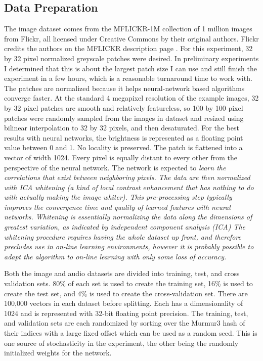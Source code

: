 \documentclass[12pt]{article}
\begin{document}
\begin{doublespacing}
	\subsection{Data Preparation}
	The image dataset comes from the MFLICKR-1M collection of 1 million images from Flickr, all licensed under Creative Commons by their original authors. Flickr credits the authors on the MFLICKR description page \cite{huiskes08}. For this experiment, 32 by 32 pixel normalized greyscale patches were desired. In preliminary experiments I determined that this is about the largest patch size I can use and still finish the experiment in a few hours, which is a reasonable turnaround time to work with. The patches are normalized because it helps neural-network based algorithms converge faster. At the standard 4 megapixel resolution of the example images, 32 by 32 pixel patches are smooth and relatively featureless, so 100 by 100 pixel patches were randomly sampled from the images in dataset and resized using bilinear interpolation to 32 by 32 pixels, and then desaturated. For the best results with neural networks, the brightness is represented as a floating point value between 0 and 1. No locality is preserved. The patch is flattened into a vector of width 1024. Every pixel is equally distant to every other from the perspective of the neural network. The network is expected to \em learn \em the correlations that exist between neighboring pixels. The data are then normalized with ICA whitening (a kind of local contrast enhancement that has nothing to do with actually making the image whiter). This pre-processing step typically improves the convergence time and quality of learned features with neural networks. Whitening is essentially normalizing the data along the dimensions of greatest variation, as indicated by independent component analysis (ICA) The whitening procedure requires having the whole dataset up front, and therefore precludes use in on-line learning environments, however it is probably possible to adapt the algorithm to on-line learning with only some loss of accuracy.
	
	Both the image and audio datasets are divided into training, test, and cross validation sets. 80\% of each set is used to create the training set, 16\% is used to create the test set, and 4\% is used to create the cross-validation set. There are 100,000 vectors in each dataset before splitting. Each has a dimensionality of 1024 and is represented with 32-bit floating point precision. The training, test, and validation sets are each randomized by sorting over the Murmur3 hash of their indices with a large fixed offset which can be used as a random seed. This is one source of stochasticity in the experiment, the other being the randomly initialized weights for the network.
	

\end{doublespacing}
\end{document}
